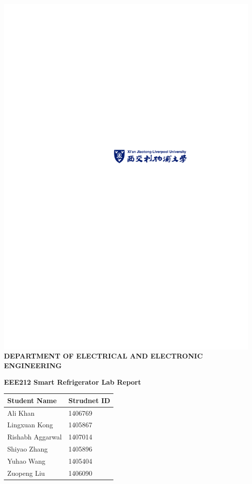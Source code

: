 \documentclass[12pt,onecolumn]{article}
\begin{document}
\begin{titlepage}
\begin{center}
\includegraphics[scale=1.5]{CoverSheet}\\
\bf{ DEPARTMENT OF ELECTRICAL AND ELECTRONIC ENGINEERING }
\end{center}
\vspace{18mm}
 \begin{center}
 \begin{Large}
 \vspace{2.0cm}
 \bf{EEE212 Smart Refrigerator Lab Report}
 \end{Large}
 \end{center} 
\vspace{2.0cm}
  \begin{center}
  \begin{large}
     \begin{tabular}{l l} 
       Student Name & Strudnet ID\\ 
       \hline
       Ali Khan & 1406769\\
       Lingxuan Kong & 1405867\\ 
       Rishabh Aggarwal & 1407014\\
       Shiyao Zhang & 1405896\\
       Yuhao Wang & 1405404\\
       Zuopeng Liu & 1406090
       
    \end{tabular}
  \end{large}
  \end{center}
\clearpage
\end{titlepage}
\end{document}
